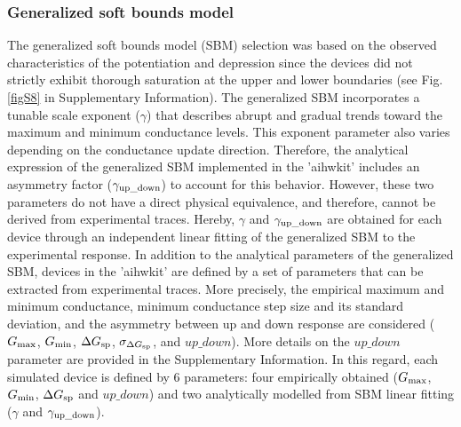 \subsubsection{Generalized soft bounds model}
The generalized soft bounds model (SBM) selection was based on the observed characteristics of the potentiation and depression since the devices did not strictly exhibit thorough saturation at the upper and lower boundaries (see Fig. \ref{figS8} in Supplementary Information). The generalized SBM incorporates a tunable scale exponent ($\gamma$) that describes abrupt and gradual trends toward the maximum and minimum conductance levels. This exponent parameter also varies depending on the conductance update direction. Therefore, the analytical expression of the generalized SBM implemented in the 'aihwkit' includes an asymmetry factor ($\gamma_{\rm up\_down}$) to account for this behavior\cite{aihwkit}. However, these two parameters do not have a direct physical equivalence, and therefore, cannot be derived from experimental traces. Hereby, $\gamma$ and $\gamma_{\rm up\_down}$ are obtained for each device through an independent linear fitting of the generalized SBM to the experimental response. In addition to the analytical parameters of the generalized SBM, devices in the 'aihwkit' are defined by a set of parameters that can be extracted from experimental traces. More precisely, the empirical maximum and minimum conductance, minimum conductance step size and its standard deviation, and the asymmetry between up and down response are considered ($G_{\rm max}$, $G_{\rm min}$, $\Delta G_{\rm sp}$, $\sigma_{\Delta G_{\rm sp}}$, and $up\_down$). More details on the $up\_down$ parameter are provided in the Supplementary Information. In this regard, each simulated device is defined by 6 parameters: four empirically obtained ($G_{\rm max}$, $G_{\rm min}$, $\Delta G_{\rm sp}$ and $up\_down$) and two analytically modelled from SBM linear fitting ($\gamma$ and $\gamma_{\rm up\_down}$).

